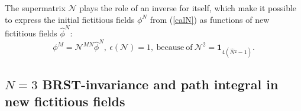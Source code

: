 \documentclass[10pt]{article}
\begin{document}
The supermatrix $\mathcal{N}$ plays the role of an inverse for itself, which make it possible
to express the initial fictitious fields $\phi^N $ from (\ref{calN})
as functions of new fictitious fields $\widehat{\phi}^N $:
\begin{equation}\label{invtrans}
  \phi^M =   \mathcal{N}^{MN}\widehat{\phi}^N,\  \epsilon(\mathcal{N})=1,\   \mathrm{because\ of} \   \mathcal{N}^2= \mathbf{1}_{4(\hat{N}{}^2-1)} .
\end{equation}

\subsection{$N=3$ BRST-invariance and path integral in new fictitious fields}\label{N3FPtricklocnew}
\end{document}

